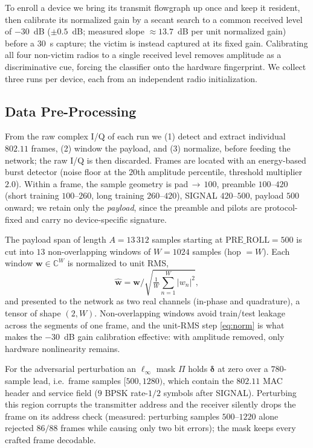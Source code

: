 \documentclass[11pt]{article}
\begin{document}
To enroll a device we bring its transmit flowgraph up once and keep it resident, then calibrate
its normalized gain by a secant search to a common received level of $-30$~dB ($\pm 0.5$~dB;
measured slope $\approx\!13.7$~dB per unit normalized gain) before a $30$~s capture; the victim is
instead captured at its fixed gain. Calibrating all four non-victim radios to a single received
level removes amplitude as a discriminative cue, forcing the classifier onto the hardware
fingerprint. We collect three runs per device, each from an independent radio initialization.

\subsection{Data Pre-Processing}
From the raw complex I/Q of each run we (1) detect and extract individual $802.11$ frames,
(2) window the payload, and (3) normalize, before feeding the network; the raw I/Q is then
discarded. Frames are located with an energy-based burst detector (noise floor at the $20$th
amplitude percentile, threshold multiplier $2.0$). Within a frame, the sample geometry is
pad$\,\to\,100$, preamble $100$--$420$ (short training $100$--$260$, long training $260$--$420$),
SIGNAL $420$--$500$, payload $500$ onward; we retain only the \emph{payload}, since the preamble
and pilots are protocol-fixed and carry no device-specific signature.

The payload span of length $A=13\,312$ samples starting at $\mathrm{PRE\_ROLL}=500$ is cut into
$13$ non-overlapping windows of $W=1024$ samples (hop $=W$). Each window $\mathbf w\in\mathbb C^{W}$
is normalized to unit RMS,
\begin{equation}\label{eq:norm}
  \hat{\mathbf w}=\mathbf w\Big/\sqrt{\tfrac1W\textstyle\sum_{n=1}^{W}\lvert w_n\rvert^2},
\end{equation}
and presented to the network as two real channels (in-phase and quadrature), a tensor of shape
$(2,W)$. Non-overlapping windows avoid train/test leakage across the segments of one frame, and
the unit-RMS step \eqref{eq:norm} is what makes the $-30$~dB gain calibration effective: with
amplitude removed, only hardware nonlinearity remains.

For the adversarial perturbation an $\ell_\infty$ mask $\Pi$ holds $\boldsymbol\delta$ at zero over
a $780$-sample lead, i.e.\ frame samples $[500,1280)$, which contain the $802.11$ MAC header and
service field ($9$ BPSK rate-$1/2$ symbols after SIGNAL). Perturbing this region corrupts the
transmitter address and the receiver silently drops the frame on its address check (measured:
perturbing samples $500$--$1220$ alone rejected $86/88$ frames while causing only two bit errors);
the mask keeps every crafted frame decodable.
\end{document}
